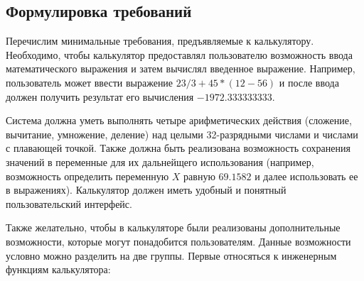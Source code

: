 \subsection{Формулировка требований}
Перечислим минимальные требования, предъявляемые к калькулятору.
Необходимо, чтобы калькулятор предоставлял пользователю 
возможность ввода математического выражения и затем вычислял 
введенное выражение. Например, пользователь может ввести 
выражение $23/3+45*(12-56)$ и после ввода должен получить 
результат его вычисления $-1972.333333333$.

Система должна уметь выполнять четыре  арифметических действия 
(сложение, вычитание, умножение, деление) над целыми 32-разрядными 
числами и числами с плавающей точкой. Также должна быть реализована 
возможность сохранения значений в переменные для их дальнейщего 
использования (например, возможность определить переменную 
$X$ равную $69.1582$ и далее использовать ее в выражениях). 
Калькулятор должен иметь удобный и понятный пользовательский интерфейс.

Также желательно, чтобы в калькуляторе были реализованы 
дополнительные возможности, которые могут понадобится пользователям.
Данные возможности условно можно разделить на две группы.
Первые относяться к инженерным функциям калькулятора:

